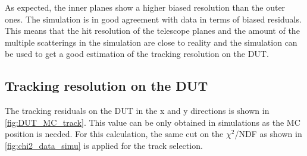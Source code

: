 As expected, the inner planes show a higher biased resolution than the
outer ones. The simulation is in good agreement with data in terms of
biased residuals. This means that the hit resolution of the telescope
planes and the amount of the multiple scatterings in the simulation
are close to reality and the simulation can be used to get a good
estimation of the tracking resolution on the DUT.




\subsection{Tracking resolution on the DUT}
The tracking residuals on the DUT in the x and y directions is shown
in \cref{fig:DUT_MC_track}. This value can be only obtained in
simulations as the MC position is needed. For this calculation, the
same cut on the $\chi^2$/NDF as shown in \cref{fig:chi2_data_simu} is
applied for the track selection.

